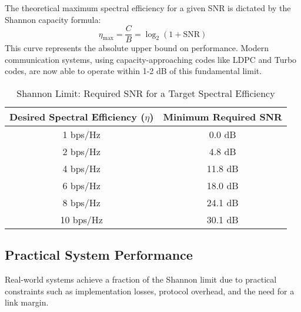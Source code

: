 The theoretical maximum spectral efficiency for a given SNR is dictated by the Shannon capacity formula:
\begin{equation}
    \eta_{\max} = \frac{C}{B} = \log_2(1 + \text{SNR})
\end{equation}
This curve represents the absolute upper bound on performance. Modern communication systems, using capacity-approaching codes like LDPC and Turbo codes, are now able to operate within 1-2 dB of this fundamental limit.

\begin{table}[H]
    \centering
    \caption{Shannon Limit: Required SNR for a Target Spectral Efficiency}
    \label{tab:shannon-efficiency}
    \begin{tabular}{@{}cc@{}}
        \toprule
        \tableheaderfont Desired Spectral Efficiency ($\eta$) & \tableheaderfont Minimum Required SNR \\
        \midrule
        1 bps/Hz & 0.0 dB \\
        2 bps/Hz & 4.8 dB \\
        4 bps/Hz & 11.8 dB \\
        6 bps/Hz & 18.0 dB \\
        8 bps/Hz & 24.1 dB \\
        10 bps/Hz & 30.1 dB \\
        \bottomrule
    \end{tabular}
\end{table}


\subsection{Practical System Performance}

Real-world systems achieve a fraction of the Shannon limit due to practical constraints such as implementation losses, protocol overhead, and the need for a link margin.

